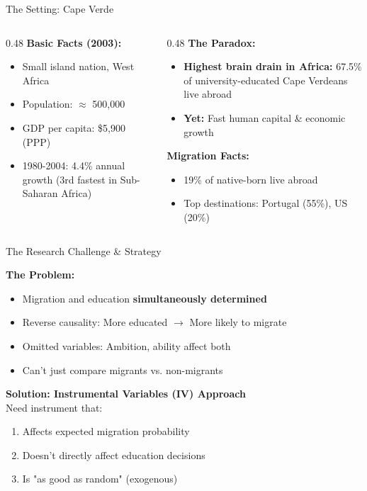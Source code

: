 \documentclass{beamer}
\begin{document}
\begin{frame}{The Setting: Cape Verde}

\begin{columns}
\begin{column}{0.48\textwidth}
\textbf{Basic Facts (2003):}
\begin{itemize}
    \item Small island nation, West Africa
    \item Population: $\approx$ 500,000
    \item GDP per capita: \$5,900 (PPP)
    \item 1980-2004: 4.4\% annual growth (3rd fastest in Sub-Saharan Africa)
\end{itemize}
\end{column}

\begin{column}{0.48\textwidth}
\textbf{The Paradox:}
\begin{itemize}
    \item \textbf{Highest brain drain in Africa:} 67.5\% of university-educated Cape Verdeans live abroad
    \item \textbf{Yet:} Fast human capital \& economic growth
\end{itemize}

\vspace{0.3cm}
\textbf{Migration Facts:}
\begin{itemize}
    \item 19\% of native-born live abroad
    \item Top destinations: Portugal (55\%), US (20\%)
\end{itemize}
\end{column}
\end{columns}

\end{frame}

\begin{frame}{The Research Challenge \& Strategy}

\textbf{The Problem:}
\begin{itemize}
    \item Migration and education \textbf{simultaneously determined}
    \item Reverse causality: More educated $\rightarrow$ More likely to migrate
    \item Omitted variables: Ambition, ability affect both
    \item Can't just compare migrants vs. non-migrants
\end{itemize}

\vspace{0.3cm}
\textbf{Solution: Instrumental Variables (IV) Approach} \\
Need instrument that:
\begin{enumerate}
    \item Affects expected migration probability
    \item Doesn't directly affect education decisions
    \item Is "as good as random" (exogenous)
\end{enumerate}
\end{frame}
\end{document}
